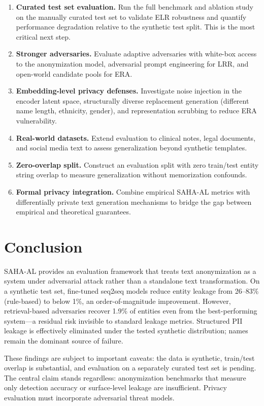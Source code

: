 \documentclass[10pt,twocolumn]{article}
\begin{document}
\begin{enumerate}
\item \textbf{Curated test set evaluation.}
Run the full benchmark and ablation study on the manually curated test set to validate ELR robustness and quantify performance degradation relative to the synthetic test split.
This is the most critical next step.
\item \textbf{Stronger adversaries.}
Evaluate adaptive adversaries with white-box access to the anonymization model, adversarial prompt engineering for LRR, and open-world candidate pools for ERA.
\item \textbf{Embedding-level privacy defenses.}
Investigate noise injection in the encoder latent space, structurally diverse replacement generation (different name length, ethnicity, gender), and representation scrubbing to reduce ERA vulnerability.
\item \textbf{Real-world datasets.}
Extend evaluation to clinical notes, legal documents, and social media text to assess generalization beyond synthetic templates.
\item \textbf{Zero-overlap split.}
Construct an evaluation split with zero train/test entity string overlap to measure generalization without memorization confounds.
\item \textbf{Formal privacy integration.}
Combine empirical SAHA-AL metrics with differentially private text generation mechanisms to bridge the gap between empirical and theoretical guarantees.
\end{enumerate}

\section{Conclusion}\label{sec:conclusion}

SAHA-AL provides an evaluation framework that treats text anonymization as a system under adversarial attack rather than a standalone text transformation.
On a synthetic test set, fine-tuned seq2seq models reduce entity leakage from 26--83\% (rule-based) to below 1\%, an order-of-magnitude improvement.
However, retrieval-based adversaries recover 1.9\% of entities even from the best-performing system---a residual risk invisible to standard leakage metrics.
Structured PII leakage is effectively eliminated under the tested synthetic distribution; names remain the dominant source of failure.

These findings are subject to important caveats: the data is synthetic, train/test overlap is substantial, and evaluation on a separately curated test set is pending.
The central claim stands regardless: anonymization benchmarks that measure only detection accuracy or surface-level leakage are insufficient.
Privacy evaluation must incorporate adversarial threat models.
\end{document}
